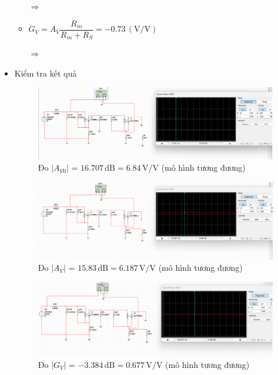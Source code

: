 \begin{itemize}[label=-]
\begin{itemize}[label=+, leftmargin=2cm]
			$\Rightarrow$ 
			\item \( G_V = A_V 
			\dfrac{R_{in}}{R_{in} + R_S} 
			= -0.73\,(\text{V/V}) \)
			
			$\Rightarrow$ 
		\end{itemize}
	\item Kiểm tra kết quả
	
	\begin{figure}[H]
		\centering
		\includegraphics[width=.8\linewidth]{./my-chapters/my-images/Question9/b_avo.png}
		\caption{Đo \(|A_{V0}|\) = \(16.707\,\text{dB} = 6.84\,\text{V/V}\) (mô hình tương đương)}
	\end{figure}
	
	\begin{figure}[H]
		\centering
		\includegraphics[width=.8\linewidth]{./my-chapters/my-images/Question9/b_av.png}
		\caption{Đo \(|A_{V}|\) = \(15.83\,\text{dB} = 6.187\,\text{V/V}\) (mô hình tương đương)}
	\end{figure}
	
	\begin{figure}[H]
		\centering
		\includegraphics[width=.8\linewidth]{./my-chapters/my-images/Question9/b_gv.png}
		\caption{Đo \(|G_{V}|\) = \(-3.384\,\text{dB} = 0.677\,\text{V/V}\) (mô hình tương đương)}
	\end{figure}
	

\end{itemize}
